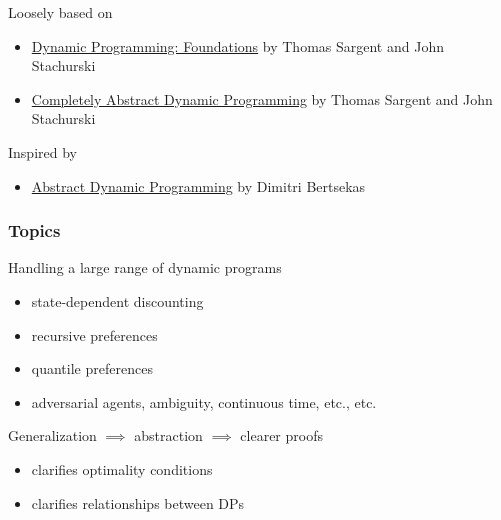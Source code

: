 \documentclass[dvipsnames]{beamer}
\subtitle{A Quick Course in Dynamic P}
\begin{document}
\begin{frame}
  \titlepage
\end{frame}


\begin{frame}
    
    Loosely based on


    \begin{itemize}
        \item \href{https://dp.quantecon.org}{Dynamic Programming: Foundations}
            by Thomas Sargent and John Stachurski
            \vspace{0.5em}
        \item \href{https://arxiv.org/abs/2308.02148}{Completely Abstract Dynamic Programming}
            by Thomas Sargent and John Stachurski
    \end{itemize}


            \vspace{0.5em}
            \vspace{0.5em}
            \vspace{0.5em}
            \vspace{0.5em}
            \vspace{0.5em}
    Inspired by
    \begin{itemize}
        \item \href{https://web.mit.edu/dimitrib/www/Abstract_DP_2ND_EDITION_Complete.pdf}{Abstract Dynamic Programming} by Dimitri Bertsekas
    \end{itemize}


\end{frame}


\begin{frame}
    \frametitle{Topics}

    Handling a large range of dynamic programs

    \begin{itemize}
        \item state-dependent discounting
            \vspace{0.5em}
        \item recursive preferences
            \vspace{0.5em}
        \item quantile preferences
            \vspace{0.5em}
        \item adversarial agents, ambiguity, continuous time, etc., etc.
    \end{itemize}


            \vspace{0.5em}
            \vspace{0.5em}
    Generalization $\implies$ abstraction $\implies$ clearer proofs 

    \begin{itemize}
        \item clarifies optimality conditions
            \vspace{0.5em}
        \item clarifies relationships between DPs
    \end{itemize}

\end{frame}
\end{document}
